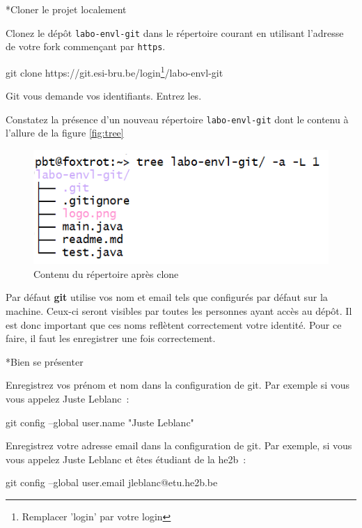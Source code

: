 \documentclass[a4paper,11pt]{style-esi/td}
\newcommand{\git}{\textbf{git}\xspace}
\begin{document}
\begin{Exercice}*{Cloner le projet localement}
	\begin{steps}
		
	\item Clonez le dépôt \texttt{labo-envl-git} dans le répertoire courant en
		utilisant l'adresse de votre fork commençant par \texttt{https}. 

		\begin{term}
			git clone https://git.esi-bru.be/login\footnote{Remplacer 'login' par votre login}/labo-envl-git
		\end{term}

		Git vous demande vos identifiants. Entrez les.  

	\item Constatez la présence d'un nouveau répertoire \texttt{labo-envl-git} dont le contenu à l'allure de la figure \vref{fig:tree}

		\begin{figure}[h]
			\centering
			\includegraphics[width=.7\linewidth]{img/tree.png}
			\caption{Contenu du répertoire après clone}
			\label{fig:tree}
		\end{figure}
	
	\end{steps}
\end{Exercice}

Par défaut \git utilise vos nom et email tels que configurés par défaut sur la
machine. Ceux-ci seront visibles par toutes les personnes ayant accès au dépôt.
Il est donc important que ces noms reflètent correctement votre identité. Pour
ce faire, il faut les enregistrer une fois correctement. 

\begin{Exercice}*{Bien se présenter}
	\begin{steps}

	\item Enregistrez vos prénom et nom dans la configuration de git. Par
		exemple si vous vous appelez Juste Leblanc~:

	\begin{term}
		git config --global user.name "Juste Leblanc"
	\end{term}
	
	\item Enregistrez votre adresse email dans la configuration de git. Par
		exemple, si vous vous appelez Juste Leblanc et êtes étudiant de la he2b~:

	\begin{term}
		git config --global user.email jleblanc@etu.he2b.be
	\end{term}

	\end{steps}
\end{Exercice}
\end{document}
